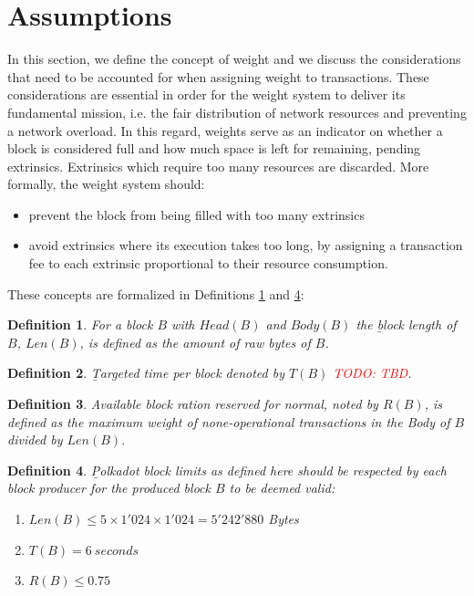 \documentclass[11pt,a4paper]{article}
\newtheorem{definition}{Definition}
\newcommand{\todo}[1]{\textcolor{red}{TODO: #1}}
\begin{document}
\section{Assumptions}\label{sec:assumptions}

In this section, we define the concept of weight and we discuss the
considerations that need to be accounted for when assigning weight to
transactions. These considerations are essential in order for the weight system
to deliver its fundamental mission, i.e. the fair distribution of network
resources and preventing a network overload. In this regard, weights serve as an
indicator on whether a block is considered full and how much space is left for
remaining, pending extrinsics. Extrinsics which require too many resources are
discarded. More formally, the weight system should:

\begin{itemize}
\item prevent the block from being filled with too many extrinsics
\item avoid extrinsics where its execution takes too long, by assigning a
transaction fee to each extrinsic proportional to their resource consumption.
\end{itemize}

These concepts are formalized in Definitions \ref{def:block-length} and
\ref{def:polkadot-block-limits}:

\begin{definition}
  \label{def:block-length}
  For a block $B$ with $Head(B)$ and $Body(B)$ the {\b block length of $B$},
  $Len(B)$, is defined as the amount of raw bytes of $B$.
\end{definition}

\begin{definition}
  \label{def:target-time-per-block}
  {\b Targeted time per block} denoted by $T(B)$ \todo{TBD}.
\end{definition}

\begin{definition}
  \label{def:block-target-time}
  Available block ration reserved for normal, noted by $R(B)$, is defined as the
  maximum weight of none-operational transactions in the Body of $B$ divided by
  $Len(B)$.
\end{definition}

\begin{definition}
  \label{def:polkadot-block-limits}
        {\b Polkadot block limits} as defined here should be respected by each
        block producer for the produced block $B$ to be deemed valid:
        
        \begin{enumerate}
         \item $Len(B) \le 5 \times 1'024 \times 1'024 = 5'242'880$ Bytes
         \item $T(B) = 6\ seconds$
         \item $R(B) \le 0.75$
        \end{enumerate}
        
\end{definition}
\end{document}
